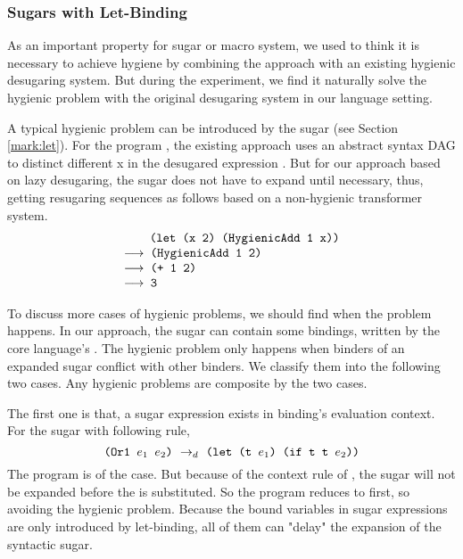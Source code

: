 \subsubsection{Sugars with Let-Binding}
\label{mark:hygienic}

As an important property for sugar or macro system, we used to think it is necessary to achieve hygiene by combining the approach with an existing hygienic desugaring system. But during the experiment, we find it naturally solve the hygienic problem with the original desugaring system in our language setting.

A typical hygienic problem can be introduced by the sugar  (see Section \ref{mark:let}). For the program , the existing approach uses an abstract syntax DAG to distinct different x in the desugared expression . But for our approach based on lazy desugaring, the  sugar does not have to expand until necessary, thus, getting resugaring sequences as follows based on a non-hygienic transformer system.
\[
	\begin{array}{l}
		\quad\;\;\Code{ (let (x 2) (HygienicAdd 1 x))}\\
		\OneStep{ \Code{ (HygienicAdd 1 2)}}\\
		\OneStep{ \Code{ (+ 1 2)}}\\
		\OneStep{ \Code{ 3}}
	\end{array}
\]

 To discuss more cases of hygienic problems, we should find when the problem happens. In our approach, the sugar can contain some bindings, written by the core language's . The hygienic problem only happens when binders of an expanded sugar conflict with other binders. We classify them into the following two cases. Any hygienic problems are composite by the two cases.

The first one is that, a sugar expression exists in binding's evaluation context. For the sugar  with following rule,
\[\texttt{(Or1~$e_1$~$e_2$)} ~\rightarrow_d~ \texttt{(let (t $e_1$) (if t t $e_2$))}\]
The program  is of the case. But because of the context rule of , the sugar  will not be expanded before the  is substituted. So the program reduces to  first, so avoiding the hygienic problem. Because the bound variables in sugar expressions are only introduced by let-binding, all of them can "delay" the expansion of the syntactic sugar.

